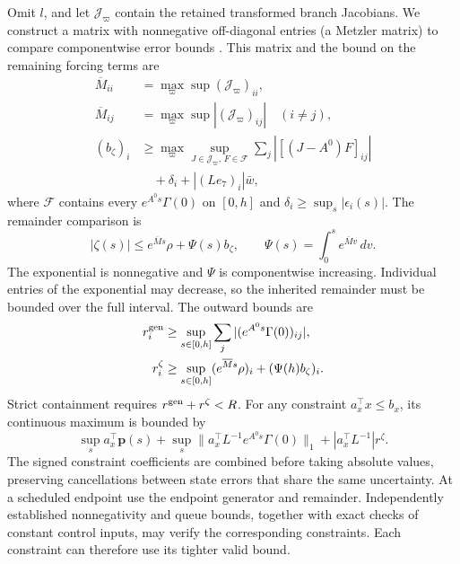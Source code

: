 \documentclass[preprint,12pt]{elsarticle}
\theoremstyle{definition}
\theoremstyle{plain}
\theoremstyle{definition}
\theoremstyle{plain}
\begin{document}
Omit $l$, and let $\mathcal J_\varpi$ contain the retained transformed branch
Jacobians. We construct a matrix with nonnegative off-diagonal entries (a Metzler
matrix) to compare componentwise error bounds \cite{farina2000positive}. This matrix and the bound
on the remaining forcing terms are
\begin{equation}
 \begin{aligned}
 \overline{M}_{ii}&=\max_\varpi\sup(\mathcal J_\varpi)_{ii},\\
 \overline{M}_{ij}&=\max_\varpi\sup|(\mathcal J_\varpi)_{ij}|\quad(i\ne j),\\
 (b_\zeta)_i&\ge\max_\varpi\sup_{J\in\mathcal J_\varpi,\,F\in\mathcal F}
                  \sum_j|[(J-A^0)F]_{ij}|\\
             &\hspace{1em}+\delta_i+|(Le_7)_i|\bar w,
 \end{aligned}
 \label{eq:structure-metzler}
\end{equation}
where $\mathcal F$ contains every $e^{A^0s}\Gamma(0)$ on $[0,h]$ and
$\delta_i\ge\sup_s|\epsilon_i(s)|$. The remainder comparison is
\begin{equation}
 |\zeta(s)|\le e^{\overline{M}s}\rho+\Psi(s)b_\zeta,
 \qquad \Psi(s)=\int_0^s e^{\overline{M}v}\,dv.
 \label{eq:structure-remainder-bound}
\end{equation}
The exponential is nonnegative and $\Psi$ is componentwise increasing.
Individual entries of the exponential may decrease, so the inherited
remainder must be bounded over the full interval. The outward bounds are
\begin{equation}
 \begin{aligned}
 r_i^{\rm gen}&\ge\sup_{s\in[0,h]}\sum_j|(e^{A^0s}\Gamma(0))_{ij}|,\\
 r_i^\zeta&\ge\sup_{s\in[0,h]}(e^{\overline{M}s}\rho)_i
                            +(\Psi(h)b_\zeta)_i.
 \end{aligned}
 \label{eq:structure-continuous-radii}
\end{equation}
Strict containment requires $r^{\rm gen}+r^\zeta<R$. For any constraint
$a_x^\top x\le b_x$, its continuous maximum is bounded by
\begin{equation}
 \sup_s a_x^\top \mathbf{p}(s)+
 \sup_s\|a_x^\top L^{-1}e^{A^0s}\Gamma(0)\|_1+
 |a_x^\top L^{-1}|r^\zeta.
 \label{eq:structure-signed-output}
\end{equation}
The signed constraint coefficients are combined before taking absolute
values, preserving cancellations between state errors that share the same uncertainty. At a
scheduled endpoint use the endpoint generator and remainder. Independently established nonnegativity and queue bounds, together with
exact checks of constant control inputs, may verify the corresponding
constraints. Each constraint can therefore use its tighter valid bound.
\end{document}
